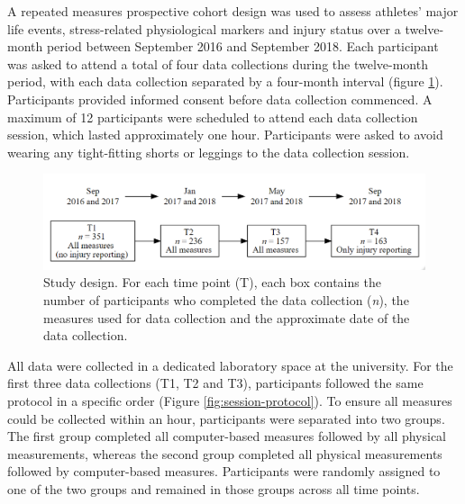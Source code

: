 \documentclass[
  english,
  man,floatsintext]{apa6}
\begin{document}
A repeated measures prospective cohort design was used to assess athletes' major life events, stress-related physiological markers and injury status over a twelve-month period between September 2016 and September 2018.
Each participant was asked to attend a total of four data collections during the twelve-month period, with each data collection separated by a four-month interval (figure \ref{fig:study-design}).
Participants provided informed consent before data collection commenced.
A maximum of 12 participants were scheduled to attend each data collection session, which lasted approximately one hour.
Participants were asked to avoid wearing any tight-fitting shorts or leggings to the data collection session.

\begin{figure}

{\centering \includegraphics[width=1\linewidth]{figs/study1/studydesign_new} 

}

\caption{Study design. For each time point (T), each box contains the number of participants who completed the data collection (\textit{n}), the measures used for data collection and the approximate date of the data collection.}\label{fig:study-design}
\end{figure}

All data were collected in a dedicated laboratory space at the university.
For the first three data collections (T1, T2 and T3), participants followed the same protocol in a specific order (Figure \ref{fig:session-protocol}).
To ensure all measures could be collected within an hour, participants were separated into two groups.
The first group completed all computer-based measures followed by all physical measurements, whereas the second group completed all physical measurements followed by computer-based measures.
Participants were randomly assigned to one of the two groups and remained in those groups across all time points.
\end{document}
